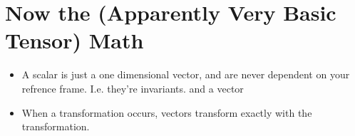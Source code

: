 \documentclass[a4paper, 11pt]{article}
\begin{document}
	\section{Now the (Apparently Very Basic Tensor) Math}
	\begin{itemize}
		\item A scalar is just a one dimensional vector, and are never dependent on your refrence frame. I.e. they're invariants. and a vector 
		\item When a transformation occurs, vectors transform exactly with the transformation.
		
	\end{itemize}
\end{document}
